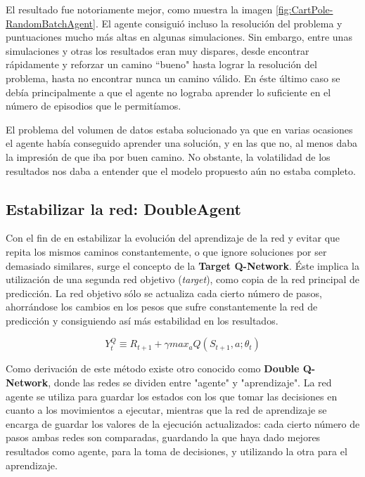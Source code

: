 El resultado fue notoriamente mejor, como muestra la imagen \ref{fig:CartPole-RandomBatchAgent}. El agente consiguió incluso la resolución del problema y puntuaciones mucho más altas en algunas simulaciones. Sin embargo, entre unas simulaciones y otras los resultados eran muy dispares, desde encontrar rápidamente y reforzar un camino ``bueno" hasta lograr la resolución del problema, hasta no encontrar nunca un camino válido. En éste último caso se debía principalmente a que el agente no lograba aprender lo suficiente en el número de episodios que le permitíamos.

El problema del volumen de datos estaba solucionado ya que en varias ocasiones el agente había conseguido aprender una solución, y en las que no, al menos daba la impresión de que iba por buen camino. No obstante, la volatilidad de los resultados nos daba a entender que el modelo propuesto aún no estaba completo.


\subsection{Estabilizar la red: DoubleAgent}

Con el fin de en estabilizar la evolución del aprendizaje de la red y evitar que repita los mismos caminos constantemente, o que ignore soluciones por ser demasiado similares, surge el concepto de la \textbf{Target Q-Network}. Éste implica la utilización de una segunda red objetivo (\textit{target}), como copia de la red principal de predicción. La red objetivo sólo se actualiza cada cierto número de pasos, ahorrándose los cambios en los pesos que sufre constantemente la red de predicción y consiguiendo así más estabilidad en los resultados.

$$Y^Q_{t} \equiv R_{t+1} + \gamma max_{a} Q(S_{t+1}, a; \theta_{t})$$

Como derivación de este método existe otro conocido como \textbf{Double Q-Network}, donde las redes se dividen entre "agente" y "aprendizaje". La red agente se utiliza para guardar los estados con los que tomar las decisiones en cuanto a los movimientos a ejecutar, mientras que la red de aprendizaje se encarga de guardar los valores de la ejecución actualizados: cada cierto número de pasos ambas redes son comparadas, guardando la que haya dado mejores resultados como agente, para la toma de decisiones, y utilizando la otra para el aprendizaje.

